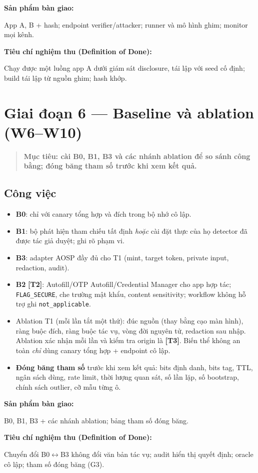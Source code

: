 \documentclass[11pt,a4paper]{article}
\newcommand{\code}[1]{\texttt{\small #1}}
\newcommand{\term}[1]{\textbf{#1}}
\newcommand{\Ttwo}{\textbf{\color{shblue}[T2]}}
\newcommand{\Tthree}{\textbf{\color{shgray}[T3]}}
\newenvironment{phasebox}
  {\begin{quote}\color{shblue}\bfseries}
  {\end{quote}}
\newcommand{\dod}[1]{\par\vspace{0.3em}\noindent\textbf{\color{shgreen}Tiêu chí nghiệm thu (Definition of Done):}\par\vspace{0.2em}\noindent #1}
\newcommand{\deliverable}[1]{\par\vspace{0.3em}\noindent\textbf{\color{shblue}Sản phẩm bàn giao:}\par\vspace{0.2em}\noindent #1}
\begin{document}
\deliverable{App A, B + hash; endpoint verifier/attacker; runner và mô hình ghim; monitor mọi kênh.}

\dod{Chạy được một luồng app A dưới giám sát disclosure, tái lập với seed cố định; build tái lập từ nguồn ghim; hash khớp.}

\section{Giai đoạn 6 --- Baseline và ablation (W6--W10)}

\begin{phasebox}Mục tiêu: cài B0, B1, B3 và các nhánh ablation để so sánh công bằng; đóng băng tham số trước khi xem kết quả.\end{phasebox}

\subsection{Công việc}

\begin{itemize}
  \item \term{B0}: chỉ với canary tổng hợp và đích trong bộ nhớ cô lập.
  \item \term{B1}: bộ phát hiện tham chiếu tất định \emph{hoặc} cài đặt thực của họ detector đã được tác giả duyệt; ghi rõ phạm vi.
  \item \term{B3}: adapter AOSP đầy đủ cho T1 (mint, target token, private input, redaction, audit).
  \item \term{B2} \Ttwo: Autofill/OTP Autofill/Credential Manager cho app hợp tác; \code{FLAG\_SECURE}, che trường mật khẩu, content sensitivity; workflow không hỗ trợ ghi \code{not\_applicable}.
  \item Ablation T1 (mỗi lần tắt một thứ): đúc nguồn (thay bằng cạo màn hình), ràng buộc đích, ràng buộc tác vụ, vòng đời nguyên tử, redaction sau nhập. Ablation xác nhận mỗi lần và kiểm tra origin là \Tthree.
        Biến thể không an toàn \emph{chỉ} dùng canary tổng hợp + endpoint cô lập.
  \item \textbf{Đóng băng tham số} trước khi xem kết quả: bits định danh, bits tag, TTL, ngân sách dùng, rate limit, thời lượng quan sát, số lần lặp, số bootstrap, chính sách outlier, cỡ mẫu từng ô.
\end{itemize}

\deliverable{B0, B1, B3 + các nhánh ablation; bảng tham số đóng băng.}

\dod{Chuyển đổi B0$\leftrightarrow$B3 không đổi văn bản tác vụ; audit hiển thị quyết định; oracle cô lập; tham số đóng băng (G3).}
\end{document}
